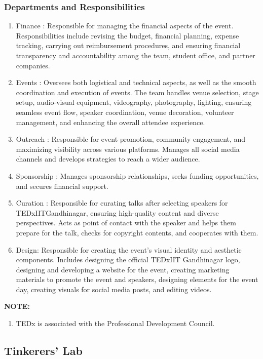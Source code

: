 \documentclass[12pt]{article}
\begin{document}
\subsubsection{Departments and Responsibilities}
\begin{enumerate}
    \item Finance : Responsible for managing the financial aspects of the event. Responsibilities include revising the budget, financial planning, expense tracking, carrying out reimbursement procedures, and ensuring financial transparency and accountability among the team, student office, and partner companies.
    \item Events : Oversees both logistical and technical aspects, as well as the smooth coordination and execution of events. The team handles venue selection, stage setup, audio-visual equipment, videography, photography, lighting, ensuring seamless event flow, speaker coordination, venue decoration, volunteer management, and enhancing the overall attendee experience.
    \item Outreach : Responsible for event promotion, community engagement, and maximizing visibility across various platforms. Manages all social media channels and develops strategies to reach a wider audience.
    \item Sponsorship : Manages sponsorship relationships, seeks funding opportunities, and secures financial support.
    \item Curation : Responsible for curating talks after selecting speakers for TEDxIITGandhinagar, ensuring high-quality content and diverse perspectives. Acts as point of contact with the speaker and helps them prepare for the talk, checks for copyright contents, and cooperates with them.
    \item Design: Responsible for creating the event's visual identity and aesthetic components. Includes designing the official TEDxIIT Gandhinagar logo, designing and developing a website for the event, creating marketing materials to promote the event and speakers, designing elements for the event day, creating visuals for social media posts, and editing videos.
\end{enumerate}

\noindent \textbf{NOTE:} \begin{enumerate}
    \item TEDx is associated with the Professional Development Council.
\end{enumerate}


\subsection{Tinkerers' Lab} \label{Tinkerers' Lab}
\end{document}
